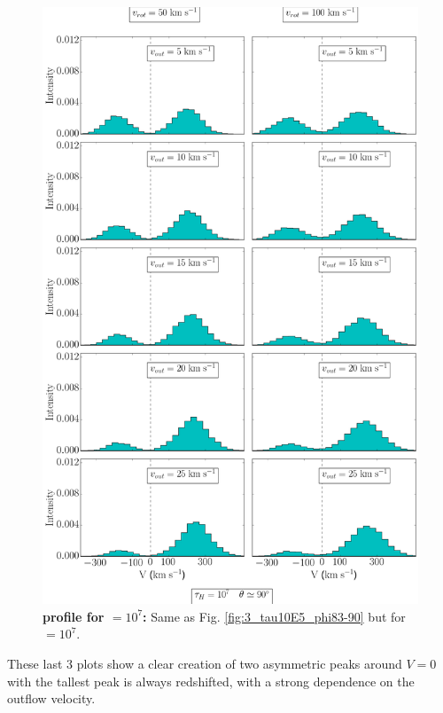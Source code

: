 \begin{figure}[h!]
	\begin{center}
		\includegraphics[height=0.85\textheight]{./figures/chapter3/3_tau10E7_phi83-90}
	\end{center}
	\caption{\textbf{\lya profile for \tauh$=10^7$:} Same as Fig. \ref{fig:3_tau10E5_phi83-90} but for \tauh$=10^7$.
		\label{fig:3_tau10E7_phi83-90}}
\end{figure}

\newpage

These last 3 plots show a clear creation of two asymmetric peaks around $V=0$ \kms with the tallest peak is always redshifted, with a strong dependence on the outflow velocity.\\

